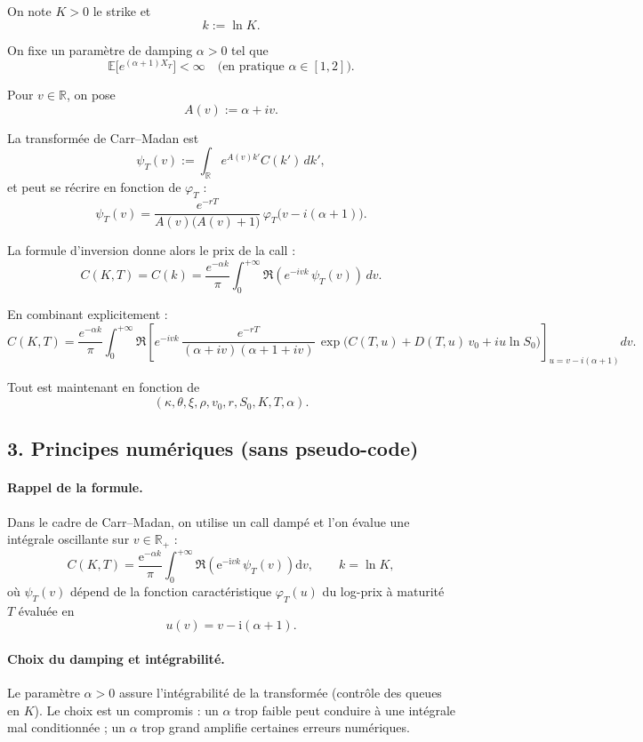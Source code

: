 \documentclass[11pt,a4paper]{article}
\newcommand{\dd}{\mathrm{d}}
\newcommand{\ee}{\mathrm{e}}
\newcommand{\ii}{\mathrm{i}}
\newcommand{\R}{\mathbb{R}}
\newcommand{\1}{\mathbf{1}}
\begin{document}
On note $K>0$ le strike et
\[
k := \ln K .
\]

On fixe un param\`etre de damping $\alpha>0$ tel que
\[
\mathbb{E}\big[e^{(\alpha+1)X_T}\big] < \infty
\quad\text{(en pratique $\alpha\in[1,2]$).}
\]

Pour $v\in\mathbb{R}$, on pose
\[
A(v) := \alpha + iv.
\]

La transform\'ee de Carr--Madan est
\[
\psi_T(v)
:= \int_{\mathbb{R}} e^{A(v) k'} C(k')\,dk',
\]
et peut se r\'ecrire en fonction de $\varphi_T$ :
\[
\boxed{\displaystyle
\psi_T(v)
= \frac{e^{-rT}}{A(v)\big(A(v)+1\big)}\,
  \varphi_T\big(v - i(\alpha+1)\big).
}
\]

La formule d'inversion donne alors le prix de la call :
\[
\boxed{\displaystyle
C(K,T)
= C(k)
= \frac{e^{-\alpha k}}{\pi}
  \int_0^{+\infty}
    \Re\!\left(
      e^{-ivk}\,\psi_T(v)
    \right)\,dv.
}
\]

En combinant explicitement :
\[
\boxed{\displaystyle
C(K,T)
=
\frac{e^{-\alpha k}}{\pi}
\int_0^{+\infty}
\Re\!\left[
e^{-ivk}\,
\frac{e^{-rT}}{(\alpha+iv)(\alpha+1+iv)}\,
\exp\Big(
C(T,u) + D(T,u)\,v_0 + iu\ln S_0
\Big)
\right]_{u=v-i(\alpha+1)}
dv.
}
\]

Tout est maintenant en fonction de
\[
(\kappa,\theta,\xi,\rho,v_0,r,S_0,K,T,\alpha).
\]

\subsection*{3. Principes num\'eriques (sans pseudo-code)}

\paragraph{Rappel de la formule.}
Dans le cadre de Carr--Madan, on utilise un call damp\'e et l'on \'evalue une int\'egrale oscillante sur $v\in\R_+$ :
\[
C(K,T)
=
\frac{\ee^{-\alpha k}}{\pi}\int_0^{+\infty}\Re\!\left(\ee^{-\ii v k}\,\psi_T(v)\right)\dd v,
\qquad
k=\ln K,
\]
o\`u $\psi_T(v)$ d\'epend de la fonction caract\'eristique $\varphi_T(u)$ du log-prix \`a maturit\'e $T$ \'evalu\'ee en
\[
u(v)=v-\ii(\alpha+1).
\]

\paragraph{Choix du damping et int\'egrabilit\'e.}
Le param\`etre $\alpha>0$ assure l'int\'egrabilit\'e de la transform\'ee (contr\^ole des queues en $K$). Le choix est un compromis :
un $\alpha$ trop faible peut conduire \`a une int\'egrale mal conditionn\'ee ; un $\alpha$ trop grand amplifie certaines erreurs num\'eriques.
\end{document}
